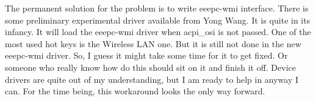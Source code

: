 {The permanent solution for the problem is to write eeepc-wmi interface. There is some preliminary 
experimental driver available from Yong Wang. It is quite in its infancy. It will load the eeepc-wmi 
driver when acpi\_osi is not passed. One of the most used hot keys is the Wireless LAN one. 
But it is still not done in the new eeepc-wmi driver. So, I guess it might take some time 
for it to get fixed. Or someone who really know how do this should sit on it and finish it off. 
Device drivers are quite out of my understanding, but I am ready to help in anyway I can. 
For the time being, this workaround looks the only way forward.
}
\newpage 

